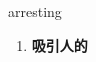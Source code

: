 
\begin{frame}
{\huge arresting}
\begin{center}
\begin{enumerate}\Large
  \item \textbf{吸引人的}
\end{enumerate}
\end{center}
\end{frame}

